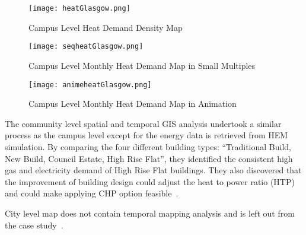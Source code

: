 \begin{figure}[h!]
  \centering
  \texttt{[image: heatGlasgow.png]}
  \caption[Heat Demand Density]{Campus Level Heat Demand Density Map~\cite{Diaz2013campus}}
  \label{fig:heatGlasgow}
\end{figure}

\begin{figure}[h!]
  \centering
  \texttt{[image: seqheatGlasgow.png]}
  \caption[Monthly Heat Demand (Small Multiple)]{Campus Level Monthly Heat Demand Map in Small Multiples\cite{Diaz2013campus}}
  \label{fig:seqheatGlasgow}
\end{figure}

\begin{figure}[h!]
  \centering
  \texttt{[image: animeheatGlasgow.png]}
  \caption[Campus Animated Map]{Campus Level Monthly Heat Demand Map in Animation\cite{Diaz2013campus}}
  \label{fig:animeheatGlasgow}
\end{figure}

The community level spatial and temporal GIS analysis undertook a
similar process as the campus level except for the energy data is
retrieved from HEM simulation. By comparing the four different
building types: ``Traditional Build, New Build, Council Estate, High
Rise Flat'', they identified the consistent high gas and electricity
demand of High Rise Flat buildings. They also discovered that the
improvement of building design could adjust the heat to power ratio
(HTP) and could make applying CHP option feasible~\cite{Diaz2013com}.

City level map does not contain temporal mapping analysis and is left
out from the case study~\cite{Diaz2013city}.